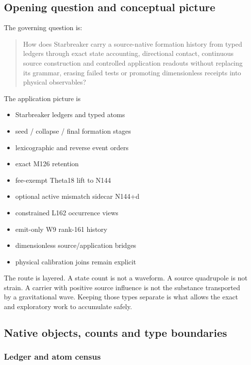 \subsection{Opening question and conceptual
picture}\label{viii-ch08-opening-question-and-conceptual-picture}

The governing question is:

\begin{quote}
How does Starbreaker carry a source-native formation history from typed
ledgers through exact state accounting, directional contact, continuous
source construction and controlled application readouts without
replacing its grammar, erasing failed tests or promoting dimensionless
receipts into physical observables?
\end{quote}

The application picture is

\begin{itemize}
\tightlist
\item
  Starbreaker ledgers and typed atoms
\item
  seed / collapse / final formation stages
\item
  lexicographic and reverse event orders
\item
  exact M126 retention
\item
  fee-exempt Theta18 lift to N144
\item
  optional active mismatch sidecar N144+d
\item
  constrained L162 occurrence views
\item
  emit-only W9 rank-161 history
\item
  dimensionless source/application bridges
\item
  physical calibration joins remain explicit
\end{itemize}

The route is layered. A state count is not a waveform. A source
quadrupole is not strain. A carrier with positive source influence is
not the substance transported by a gravitational wave. Keeping those
types separate is what allows the exact and exploratory work to
accumulate safely.

\subsection{Native objects, counts and type
boundaries}\label{viii-ch08-native-objects-counts-and-type-boundaries}

\subsubsection{Ledger and atom census}\label{viii-ch08-ledger-and-atom-census}

